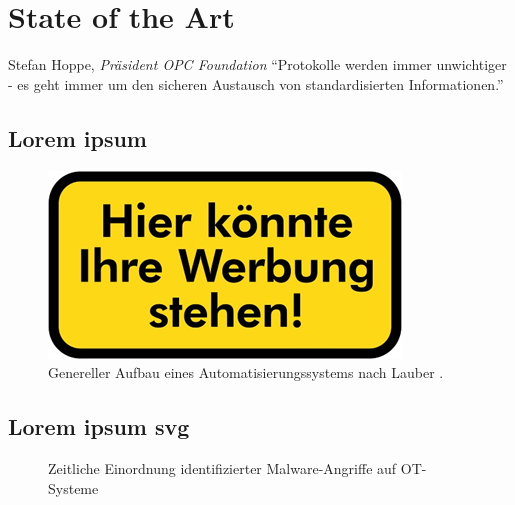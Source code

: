 \section{State of the Art}%

\begin{chapquote}{Stefan Hoppe, \textit{Präsident OPC Foundation}}
``Protokolle werden immer unwichtiger - es geht immer um den sicheren Austausch von standardisierten Informationen.''
\end{chapquote}

\noindent \lipsum[1-2]

\subsection{Lorem ipsum}
\noindent \lipsum[1-2]

\begin{figure}[h]
    \centering
    \includegraphics[width=1.0\linewidth]{Figures/Platzhalter.png}
    \caption{Genereller Aufbau eines Automatisierungssystems nach Lauber \cite{Lauber1999}.}
    \label{fig:Prozessautomatisierungssystem}
\end{figure}

\noindent \lipsum[1-2]

\subsection{Lorem ipsum svg}
\noindent \lipsum[1-4]
\begin{figure}%
  \centering
  
  \caption{Zeitliche Einordnung identifizierter Malware-Angriffe auf OT-Systeme}
  \label{fig:Timeline}
\end{figure}


\newpage